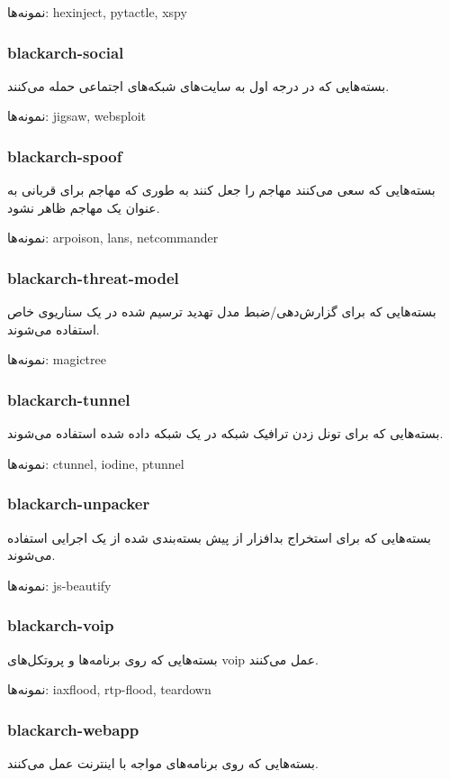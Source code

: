 \documentclass[a4paper, oneside, 11pt]{book}
\begin{document}
نمونه‌ها: hexinject, pytactle, xspy

\subsubsection{blackarch-social}
بسته‌هایی که در درجه اول به سایت‌های شبکه‌های اجتماعی حمله می‌کنند.

نمونه‌ها: jigsaw, websploit

\subsubsection{blackarch-spoof}
بسته‌هایی که سعی می‌کنند مهاجم را جعل کنند به طوری که
مهاجم برای قربانی به عنوان یک مهاجم ظاهر نشود.

نمونه‌ها: arpoison, lans, netcommander

\subsubsection{blackarch-threat-model}
بسته‌هایی که برای گزارش‌دهی/ضبط
مدل تهدید ترسیم شده در یک سناریوی خاص استفاده می‌شوند.

نمونه‌ها: magictree

\subsubsection{blackarch-tunnel}
بسته‌هایی که برای تونل زدن ترافیک شبکه در یک
شبکه داده شده استفاده می‌شوند.

نمونه‌ها: ctunnel, iodine, ptunnel

\subsubsection{blackarch-unpacker}
بسته‌هایی که برای استخراج بدافزار از پیش بسته‌بندی شده از یک
اجرایی استفاده می‌شوند.

نمونه‌ها: js-beautify

\subsubsection{blackarch-voip}
بسته‌هایی که روی برنامه‌ها و پروتکل‌های voip عمل می‌کنند.

نمونه‌ها: iaxflood, rtp-flood, teardown

\subsubsection{blackarch-webapp}
بسته‌هایی که روی برنامه‌های مواجه با اینترنت عمل می‌کنند.
\end{document}
